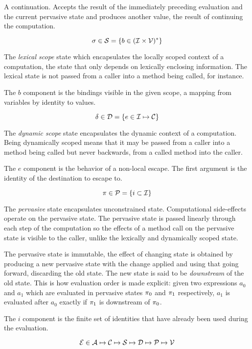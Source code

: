 \documentclass{article}
\begin{document}
A continuation. Accepts the result of the immediately preceding evaluation and
the current pervasive state and produces another value, the result of continuing
the computation.

\[ \sigma \in \mathcal{S} = \{ b \in (\mathcal{I} \times \mathcal{V})^* \} \]

The \emph{lexical scope} state which encapsulates the locally scoped context of a
computation, the state that only depends on lexically enclosing information. The
lexical state is not passed from a caller into a method being called, for
instance.

The $b$ component is the bindings visible in the given scope, a mapping from
variables by identity to values.

\[ \delta \in \mathcal{D} = \{ e \in \mathcal{I} \mapsto \mathcal{C} \} \]

The \emph{dynamic scope} state encapsulates the dynamic context of a computation.
Being dynamically scoped means that it may be passed from a caller into a method
being called but never backwards, from a called method into the caller.

The $e$ component is the behavior of a non-local escape. The first argument is
the identity of the destination to escape to.

\[ \pi \in \mathcal{P} = \{ i \subset \mathcal{I} \} \]

The \emph{pervasive} state encapsulates unconstrained state. Computational
side-effects operate on the pervasive state. The pervasive state is passed
linearly through each step of the computation so the effects of a method call on
the pervasive state is visible to the caller, unlike the lexically and dynamically
scoped state.

The pervasive state is immutable, the effect of changing state is obtained by
producing a new pervasive state with the change applied and using that going
forward, discarding the old state. The new state is said to be \emph{downstream}
of the old state. This is how evaluation order is made explicit: given two
expressions $a_0$ and $a_1$ which are evaluated in pervasive states $\pi_0$
and $\pi_1$ respectively, $a_1$ is evaluated after $a_0$ exactly if $\pi_1$
is downstream of $\pi_0$.

The $i$ component is the finite set of identities that have already been used
during the evaluation.

\[ \mathcal{E} \in \mathcal{A} \mapsto \mathcal{C} \mapsto \mathcal{S} \mapsto \mathcal{D} \mapsto \mathcal{P} \mapsto \mathcal{V} \]
\end{document}

